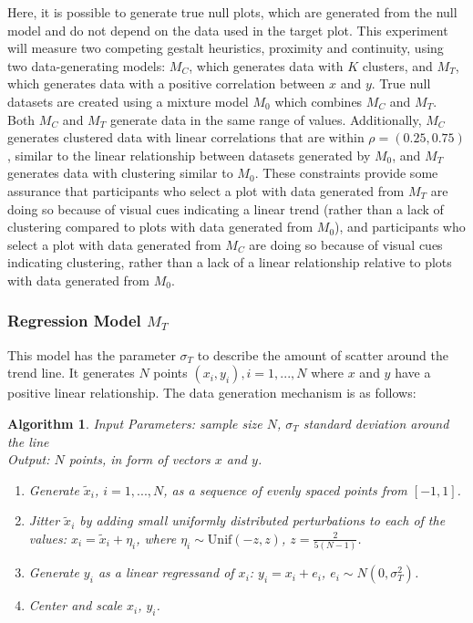 \documentclass[11pt]{isuthesis}\usepackage[]{graphicx}\usepackage[]{color}
\newtheorem{algorithm}[theorem]{Algorithm}
\begin{document}
Here, it is possible to generate true null plots, which are generated from the null model and do not depend on the data used in the target plot. 
This experiment will measure two competing gestalt heuristics, proximity and continuity, using two data-generating models: $M_C$, which generates data with $K$ clusters, and $M_T$, which generates data with a positive correlation between $x$ and $y$. 
True null datasets are created using a mixture model $M_0$ which combines $M_C$ and $M_T$. Both $M_C$ and $M_T$ generate data in the same range of values. 
Additionally, $M_C$ generates clustered data with linear correlations that are within $\rho = (0.25, 0.75)$, similar to the linear relationship between datasets generated by $M_0$, and $M_T$ generates data with clustering similar to $M_0$. These constraints provide some assurance that participants who select a plot with data generated from $M_T$ are doing so because of visual cues indicating a linear trend (rather than a lack of clustering compared to plots with data generated from $M_0$), and participants who select a plot with data generated from $M_C$ are doing so because of visual cues indicating clustering, rather than a lack of a linear relationship relative to plots with data generated from $M_0$. 


\subsubsection{Regression Model $M_T$}
This model has the parameter $\sigma_T$ to describe the amount of scatter around the trend line. It generates $N$ points $(x_i, y_i), i=1, ..., N$ where $x$ and $y$ have a positive linear relationship. The data generation mechanism is as follows: 

\begin{algorithm}\hfill\newline
  Input Parameters: sample size $N$, $\sigma_T$ standard deviation around the line \\
  Output: $N$ points, in form of vectors $x$ and $y$.
  \begin{enumerate}
    \item Generate $\tilde{x}_i$, $i=1, ..., N$, as a sequence of evenly spaced points from $[-1, 1]$. 
    \item Jitter $\tilde{x}_i$ by adding small uniformly distributed perturbations to each of the values: $x_i = \tilde{x}_i + \eta_i$, where $\eta_i \sim \text{Unif}(-z, z)$, $z = \frac{2}{5(N-1)}$.
    \item Generate $y_i$ as a linear regressand of $x_i$: $y_i = x_i + e_i$, $e_i \sim N(0, \sigma^2_T)$.
    \item Center and scale $x_i$, $y_i$.
  \end{enumerate}
\end{algorithm}
\end{document}

